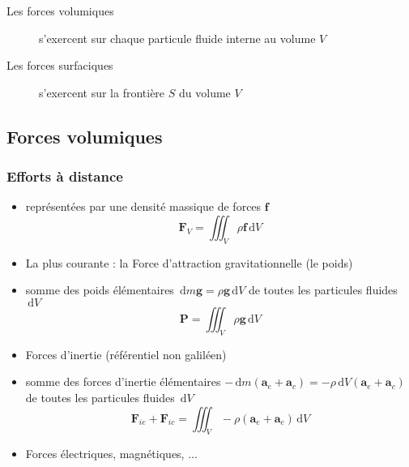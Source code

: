 \documentclass[%
	final, %
	 10pt, %
 	compress, %
hyperref={bookmarks=true}	
]{beamer}
\renewcommand{\v}[1]{\ensuremath{\bm{#1}}} %
\newcommand{\ddr}[1]{\, \mathrm{d} #1}
\begin{document}
\begin{frame}
\begin{figure}
\end{figure}
\begin{description}
\item [Les forces volumiques] s'exercent sur chaque particule fluide
  interne au volume $V$
\item[Les forces surfaciques] s'exercent sur la
  frontière $S$ du volume $V$
\end{description}
\end{frame}


\subsection{Forces volumiques}
\label{sec:forces-volumiques}

\begin{frame}\frametitle{Efforts à distance}
\begin{itemize}
\item représentées par une densité massique de forces $\v{f}$
\begin{dmath*}
\v{F}_{V} = \iiint_{V} \rho \v{f} \ddr V
\end{dmath*}
\item La plus courante : la Force d'attraction gravitationnelle (le
  poids)
\item somme des poids élémentaires $\ddr m \v{g} = \rho \v{g} \ddr V $ de toutes les particules
  fluides $\ddr V$
\begin{dmath*}
\v{P} = \iiint_{V} \rho \v{g} \ddr V
\end{dmath*}
\item Forces d'inertie (référentiel non galiléen)
\item somme des forces d'inertie élémentaires $- \ddr m (\v{a}_{e} +
  \v{a}_{c} ) = - \rho \ddr V  (\v{a}_{e} +
  \v{a}_{c} )$ de toutes les particules fluides $\ddr V$
\begin{dmath*}
\v{F}_{ie} + \v{F}_{ic} = \iiint_{V} - \rho (\v{a}_{e} +
  \v{a}_{c} )  \ddr V
\end{dmath*}
\item Forces électriques, magnétiques, ...
\end{itemize}
\end{frame}
\end{document}
